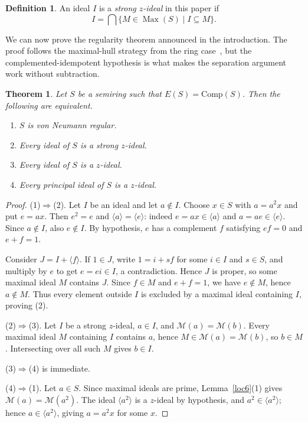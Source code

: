 \documentclass[11pt,leqno]{amsart}
\theoremstyle{plain}
\newtheorem{theorem}{Theorem}[section]
\theoremstyle{definition}
\newtheorem{definition}{Definition}[section]
\theoremstyle{remark}
\numberwithin{equation}{section}
\DeclareMathOperator{\Max}{Max}
\newcommand{\M}{\mathcal M}
\newcommand{\ideal}[1]{\langle #1\rangle}
\begin{document}
\begin{definition}\label{def:strong-z}
An ideal $I$ is a \emph{strong $z$-ideal} in this paper if
\[
I=\bigcap\{M\in\Max(S)\mid I\subseteq M\}.
\]
\end{definition}

We can now prove the regularity theorem announced in the introduction.
The proof follows the maximal-hull strategy from the ring case~\cite{Mason71/z-ideals/prime-ideals},
but the complemented-idempotent hypothesis is what makes the
separation argument work without subtraction.

\begin{theorem}\label{thm:regularity}
Let $S$ be a semiring such that $E(S)=\mathrm{Comp}(S)$.
Then the following are equivalent.
\begin{enumerate}
\item $S$ is von Neumann regular.
\item Every ideal of $S$ is a strong $z$-ideal.
\item Every ideal of $S$ is a $z$-ideal.
\item Every principal ideal of $S$ is a $z$-ideal.
\end{enumerate}
\end{theorem}
\begin{proof}
(1)$\Rightarrow$(2).
Let $I$ be an ideal and let $a\notin I$.
Choose $x\in S$ with $a=a^2x$ and put $e=ax$.
Then $e^2=e$ and $\ideal{a}=\ideal{e}$:
indeed $e=ax\in\ideal{a}$ and $a=ae\in\ideal{e}$.
Since $a\notin I$, also $e\notin I$.
By hypothesis, $e$ has a complement $f$
satisfying $ef=0$ and $e+f=1$.

Consider $J=I+\ideal{f}$.
If $1\in J$, write $1=i+sf$ for some $i\in I$ and $s\in S$,
and multiply by $e$ to get $e=ei\in I$, a contradiction.
Hence $J$ is proper, so some maximal ideal $M$ contains $J$.
Since $f\in M$ and $e+f=1$, we have $e\notin M$, hence $a\notin M$.
Thus every element outside $I$ is excluded by a maximal ideal
containing $I$, proving (2).

(2)$\Rightarrow$(3).
Let $I$ be a strong $z$-ideal, $a\in I$, and $\M(a)=\M(b)$.
Every maximal ideal $M$ containing $I$ contains $a$,
hence $M\in\M(a)=\M(b)$, so $b\in M$.
Intersecting over all such $M$ gives $b\in I$.

(3)$\Rightarrow$(4) is immediate.

(4)$\Rightarrow$(1).
Let $a\in S$.  Since maximal ideals are prime,
Lemma~\ref{loc6}(1) gives $\M(a)=\M(a^2)$.
The ideal $\ideal{a^2}$ is a $z$-ideal by hypothesis, and
$a^2\in\ideal{a^2}$; hence $a\in\ideal{a^2}$,
giving $a=a^2x$ for some $x$.
\end{proof}
\end{document}
